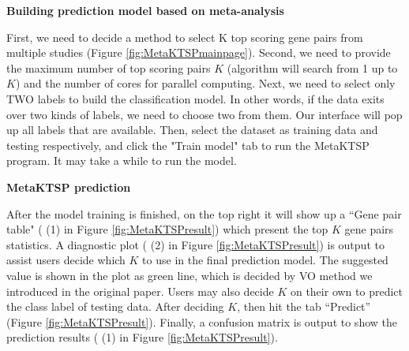 \begin{steps}
\item \textbf{Building prediction model based on meta-analysis}

First, we need to decide a method to select K top scoring gene pairs from multiple studies (Figure \ref{fig:MetaKTSPmainpage}). 
Second, we need to provide the maximum number of top scoring pairs $K$ (algorithm will search from 1 up to $K$) and the number of cores for parallel computing. 
Next, we need to select only TWO labels to build the classification model. 
In other words, if the data exits over two kinds of labels, we need to choose two from them. 
Our interface will pop up all labels that are available. 
Then, select the dataset as training data and testing respectively, 
and click the "Train model" tab to run the MetaKTSP program. 
It may take a while to run the model.

\item \textbf{MetaKTSP prediction}

After the model training is finished, on the top right it will show up a ``Gene pair table" ({\color{red} (1)} in Figure \ref{fig:MetaKTSPresult}) which present the top $K$ gene pairs statistics. 
A diagnostic plot ({\color{red} (2)} in Figure \ref{fig:MetaKTSPresult}) is output to assist users decide which $K$ to use in the final prediction model. 
The suggested value is shown in the plot as green line, which is decided by VO method we introduced in the original paper. Users may also decide $K$ on their own to predict the class label of testing data. 
After deciding $K$, then hit the tab ``Predict'' (Figure \ref{fig:MetaKTSPresult}). 
Finally, a confusion matrix is output to show the prediction results ({\color{red} (1)} in Figure \ref{fig:MetaKTSPresult}).


\end{steps}
